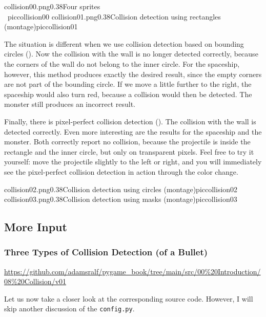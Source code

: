 \myezweihbild%
    {collision00.png}{0.38}{Four sprites\\\ }{piccollision00}%
    {collision01.png}{0.38}{Collision detection using rectangles (montage)}{piccollision01}


The situation is different when we use collision detection based on bounding circles (). Now the collision with the wall is no longer detected correctly, because the corners of the wall do not belong to the inner circle. For the spaceship, however, this method produces exactly the desired result, since the empty corners are not part of the bounding circle. If we move a little further to the right, the spaceship would also turn red, because a collision would then be detected. The monster still produces an incorrect result.

Finally, there is pixel-perfect collision detection ().  The collision with the wall is detected correctly. Even more interesting are the results for the spaceship and the monster. Both correctly report no collision, because the projectile is inside the rectangle and the inner circle, but only on transparent pixels. Feel free to try it yourself: move the projectile slightly to the left or right, and you will immediately see the pixel-perfect collision detection in action through the color change.

\myezweihbild%
    {collision02.png}{0.38}{Collision detection using circles (montage)}{piccollision02}%
    {collision03.png}{0.38}{Collision detection using masks (montage)}{piccollision03}


\subsection{More Input}
\subsubsection{Three Types of Collision Detection (of a Bullet)}
\begin{diskbox}
	\url{https://github.com/adamsralf/pygame_book/tree/main/src/00%20Introduction/08%20Collision/v01}
\end{diskbox}

Let us now take a closer look at the corresponding source code. However, I will skip another discussion of the \texttt{config.py}.

